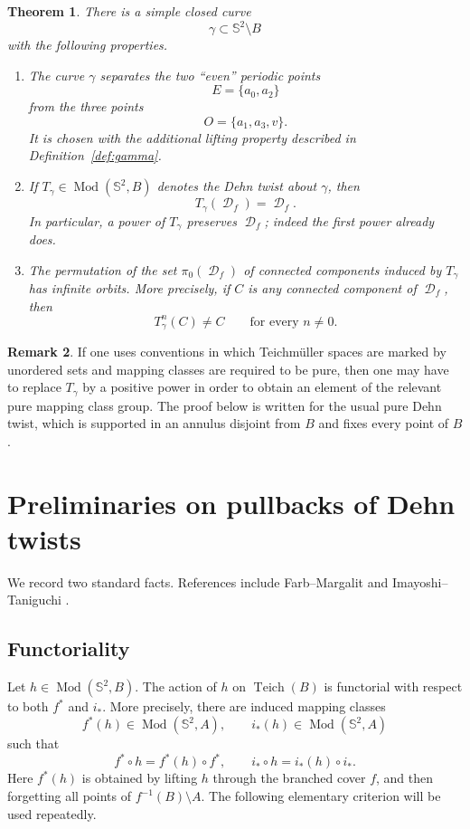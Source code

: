\documentclass[11pt]{article}
\theoremstyle{plain}
\newtheorem{theorem}{Theorem}
\theoremstyle{definition}
\newtheorem{remark}[theorem]{Remark}
\DeclareMathOperator{\Teich}{Teich}
\DeclareMathOperator{\Mod}{Mod}
\DeclareMathOperator{\D}{\mathcal D}
\newcommand{\Sph}{\mathbb S^2}
\begin{document}
\begin{theorem}\label{thm:main}
There is a simple closed curve
\[
\gamma\subset \Sph\setminus B
\]
with the following properties.
\begin{enumerate}[label=(\roman*)]
\item The curve \(\gamma\) separates the two ``even'' periodic points
\[
E=\{a_0,a_2\}
\]
from the three points
\[
O=\{a_1,a_3,v\}.
\]
It is chosen with the additional lifting property described in Definition~\ref{def:gamma}.
\item If \(T_\gamma\in \Mod(\Sph,B)\) denotes the Dehn twist about \(\gamma\), then
\[
T_\gamma(\D_f)=\D_f.
\]
In particular, a power of \(T_\gamma\) preserves \(\D_f\); indeed the first power already does.
\item The permutation of the set \(\pi_0(\D_f)\) of connected components induced by \(T_\gamma\) has infinite orbits. More precisely, if \(C\) is any connected component of \(\D_f\), then
\[
T_\gamma^n(C)\neq C\qquad\text{for every }n\neq 0.
\]
\end{enumerate}
\end{theorem}

\begin{remark}
If one uses conventions in which Teichm\"uller spaces are marked by unordered sets and mapping classes are required to be pure, then one may have to replace \(T_\gamma\) by a positive power in order to obtain an element of the relevant pure mapping class group. The proof below is written for the usual pure Dehn twist, which is supported in an annulus disjoint from \(B\) and fixes every point of \(B\).
\end{remark}

\section{Preliminaries on pullbacks of Dehn twists}

We record two standard facts. References include Farb--Margalit \cite{FM} and Imayoshi--Taniguchi \cite{IT}.

\subsection{Functoriality}

Let \(h\in \Mod(\Sph,B)\). The action of \(h\) on \(\Teich(B)\) is functorial with respect to both \(f^*\) and \(i_*\). More precisely, there are induced mapping classes
\[
f^*(h)\in \Mod(\Sph,A),\qquad i_*(h)\in \Mod(\Sph,A)
\]
such that
\[
f^*\circ h=f^*(h)\circ f^*,\qquad i_*\circ h=i_*(h)\circ i_*.
\]
Here \(f^*(h)\) is obtained by lifting \(h\) through the branched cover \(f\), and then forgetting all points of \(f^{-1}(B)\setminus A\). The following elementary criterion will be used repeatedly.
\end{document}
